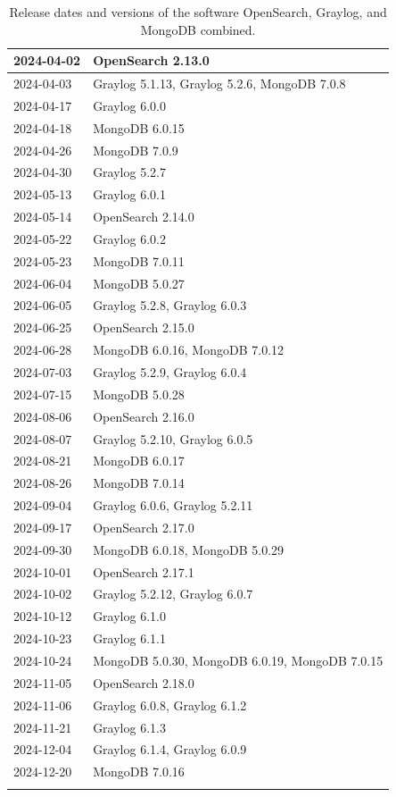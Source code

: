 \documentclass[../main.tex]{subfiles}
\begin{document}
\begin{longtable}{|l|l|}
2024-04-02 & OpenSearch 2.13.0 \\ \hline
2024-04-03 & Graylog 5.1.13, Graylog 5.2.6, MongoDB 7.0.8 \\ \hline
2024-04-17 & Graylog 6.0.0 \\ \hline
2024-04-18 & MongoDB 6.0.15 \\ \hline
2024-04-26 & MongoDB 7.0.9 \\ \hline
2024-04-30 & Graylog 5.2.7 \\ \hline
2024-05-13 & Graylog 6.0.1 \\ \hline
2024-05-14 & OpenSearch 2.14.0 \\ \hline
2024-05-22 & Graylog 6.0.2 \\ \hline
2024-05-23 & MongoDB 7.0.11 \\ \hline
2024-06-04 & MongoDB 5.0.27 \\ \hline
2024-06-05 & Graylog 5.2.8, Graylog 6.0.3 \\ \hline
2024-06-25 & OpenSearch 2.15.0 \\ \hline
2024-06-28 & MongoDB 6.0.16, MongoDB 7.0.12 \\ \hline
2024-07-03 & Graylog 5.2.9, Graylog 6.0.4 \\ \hline
2024-07-15 & MongoDB 5.0.28 \\ \hline
2024-08-06 & OpenSearch 2.16.0 \\ \hline
2024-08-07 & Graylog 5.2.10, Graylog 6.0.5 \\ \hline
2024-08-21 & MongoDB 6.0.17 \\ \hline
2024-08-26 & MongoDB 7.0.14 \\ \hline
2024-09-04 & Graylog 6.0.6, Graylog 5.2.11 \\ \hline
2024-09-17 & OpenSearch 2.17.0 \\ \hline
2024-09-30 & MongoDB 6.0.18, MongoDB 5.0.29 \\ \hline
2024-10-01 & OpenSearch 2.17.1 \\ \hline
2024-10-02 & Graylog 5.2.12, Graylog 6.0.7 \\ \hline
2024-10-12 & Graylog 6.1.0 \\ \hline
2024-10-23 & Graylog 6.1.1 \\ \hline
2024-10-24 & MongoDB 5.0.30, MongoDB 6.0.19, MongoDB 7.0.15 \\ \hline
2024-11-05 & OpenSearch 2.18.0 \\ \hline
2024-11-06 & Graylog 6.0.8, Graylog 6.1.2 \\ \hline
2024-11-21 & Graylog 6.1.3 \\ \hline
2024-12-04 & Graylog 6.1.4, Graylog 6.0.9 \\ \hline
2024-12-20 & MongoDB 7.0.16 \\ \hline
\caption{Release dates and versions of the software OpenSearch, Graylog, and MongoDB combined.}
\label{table:release_dates}
\end{longtable}
\end{document}
